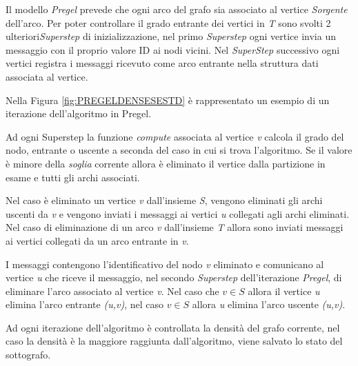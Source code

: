 \documentclass[LaM,binding=0.6cm]{sapthesis}
\begin{document}
Il modello \textit{Pregel} prevede che ogni arco del grafo sia associato al vertice \textit{Sorgente} dell'arco. Per poter controllare il grado entrante dei vertici in \textit{T} sono svolti 2 ulteriori\textit{Superstep} di inizializzazione, nel primo \textit{Superstep} ogni vertice invia un messaggio con il proprio valore ID ai nodi vicini. Nel \textit{SuperStep} successivo ogni vertici registra i messaggi ricevuto come arco entrante nella struttura dati associata al vertice.

Nella Figura \ref{fig:PREGELDENSESESTD} è rappresentato un esempio di un iterazione dell'algoritmo in Pregel.

Ad ogni Superstep la funzione \textit{compute} associata al vertice \textit{v} calcola il grado del nodo, entrante o uscente a seconda del caso in cui si trova l'algoritmo. Se il valore è minore della \textit{soglia} corrente allora è eliminato il vertice dalla partizione in esame e tutti gli archi associati.

Nel caso è eliminato un vertice \textit{v} dall'insieme \textit{S}, vengono eliminati gli archi uscenti da \textit{v} e vengono inviati i messaggi ai vertici \textit{u} collegati agli archi eliminati. Nel caso di eliminazione di un arco \textit{v} dall'insieme  \textit{T} allora sono inviati messaggi ai vertici collegati da un arco entrante in \textit{v}. 

I messaggi contengono l'identificativo del nodo \textit{v} eliminato e comunicano al vertice \textit{u} che riceve il messaggio, nel secondo \textit{Superstep} dell'iterazione \textit{Pregel}, di eliminare l'arco associato al vertice \textit{v}. Nel caso che \textit{$v\in S$} allora il vertice \textit{u} elimina l'arco entrante \textit{(u,v)}, nel caso {$v \in S$} allora \textit{u} elimina l'arco uscente \textit{(u,v)}.

Ad ogni iterazione dell'algoritmo è controllata la densità del grafo corrente, nel caso la densità è la maggiore raggiunta dall'algoritmo, viene salvato lo stato del sottografo.
\end{document}
